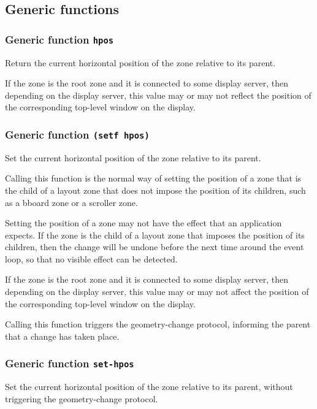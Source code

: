 \documentclass{report}
\begin{document}
\subsection{Generic functions}

\subsubsection{Generic function \texttt{hpos}}

Return the current horizontal position of the zone relative to its
parent.  

If the zone is the root zone and it is connected to some display
server, then depending on the display server, this value may or
may not reflect the position of the corresponding top-level
window on the display. 

\subsubsection{Generic function \texttt{(setf hpos)}}

Set the current horizontal position of the zone relative to its
parent.  

Calling this function is the normal way of setting the position of
a zone that is the child of a layout zone that does not impose the
position of its children, such as a bboard zone or a scroller
zone.

Setting the position of a zone may not have the effect that an
application expects.  If the zone is the child of a layout zone
that imposes the position of its children, then the change will be
undone before the next time around the event loop, so that no
visible effect can be detected.  

If the zone is the root zone and it is connected to some display
server, then depending on the display server, this value may or
may not affect the position of the corresponding top-level window
on the display.

Calling this function triggers the geometry-change protocol,
informing the parent that a change has taken place.  

\subsubsection{Generic function \texttt{set-hpos}}

Set the current horizontal position of the zone relative to its
parent, without triggering the geometry-change protocol.
\end{document}
